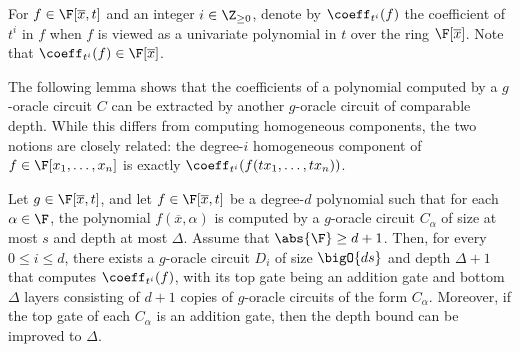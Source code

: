 \documentclass[letterpaper, 11pt]{amsart}
\begin{document}
\begin{defn}\label{defn:coeff}
For $f\in \F[\overline{x}, t]$ and an integer $i\in\Z_{\geq 0}$, denote by $\coeff_{t^i}(f)$ the coefficient of $t^i$ in $f$ when $f$ is viewed as a univariate polynomial in $t$ over the ring $\F[\overline{x}]$.
Note that $\coeff_{t^i}(f)\in \F[\overline{x}]$.
\end{defn}
The following lemma shows that the coefficients of a polynomial computed by a $g$-oracle circuit $C$ can be extracted by another $g$-oracle circuit of comparable depth. 
While this differs from computing homogeneous components, the two notions are closely related: the degree-$i$ homogeneous component of $f \in \F[x_1,\dots,x_n]$ is exactly $\coeff_{t^i}(f(tx_1,\dots,tx_n))$.
\begin{lem}\label{lem:homogenization}
Let $g \in \F[\overline{x},t]$, and let $f \in \F[\overline{x},t]$ be a degree-$d$ polynomial such that for each $\alpha \in \F$, the polynomial $f(\overline{x},\alpha)$ is computed by a $g$-oracle circuit $C_\alpha$ of size at most $s$ and depth at most $\Delta$.
Assume that $\abs{\F} \geq d + 1$.
Then, for every $0 \leq i \leq d$, there exists a $g$-oracle circuit $D_i$ of size $\bigO{ds}$ and depth $\Delta+1$ that computes $\coeff_{t^i}(f)$, with its top gate being an addition gate and bottom $\Delta$ layers consisting of $d+1$ copies of $g$-oracle circuits of the form $C_\alpha$.
Moreover, if the top gate of each $C_\alpha$ is an addition gate, then the depth bound can be improved to $\Delta$.
\end{lem}
\end{document}
